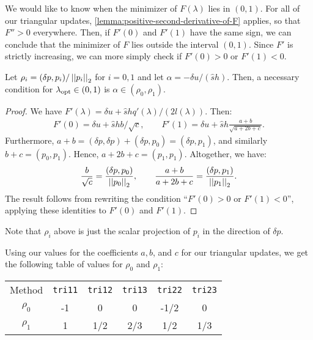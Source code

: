 \documentclass{article}
\begin{document}
We would like to know when the minimizer of $F(\lambda)$ lies in
$(0, 1)$. For all of our triangular updates,
\cref{lemma:positive-second-derivative-of-F} applies, so that
$F'' > 0$ everywhere. Then, if $F'(0)$ and $F'(1)$ have the same sign,
we can conclude that the minimizer of $F$ lies outside the interval
$(0, 1)$. Since $F'$ is strictly increasing, we can more simply check
if $F'(0) > 0$ or $F'(1) < 0$.

\begin{lemma}
  Let $\rho_i = (\delta p, p_i)/\left|\left|p_i\right|\right|_2$ for $i = 0, 1$ and let
  $\alpha = -\delta u/(\hat{s}h)$. Then, a necessary condition for
  $\lambda_{\operatorname{opt}} \in (0, 1)$ is $\alpha \in (\rho_0, \rho_1)$.
\end{lemma}

\begin{proof}
  We have
  $F'(\lambda) = \delta u + \hat{s} h q'(\lambda)/(2 l(\lambda))$. Then:
  \begin{align*}
    F'(0) = \delta u + \hat{s} h b / \sqrt{c}, \qquad F'(1) = \delta u + \hat{s} h \frac{a + b}{\sqrt{a + 2b + c}}.
  \end{align*}
  Furthermore,
  $a + b = (\delta p, \delta p) + (\delta p, p_0) = (\delta p, p_1)$,
  and similarly $b + c = (p_0, p_1)$. Hence,
  $a + 2b + c = (p_1, p_1)$. Altogether, we have:
  \begin{align*}
    \frac{b}{\sqrt{c}} = \frac{(\delta p, p_0)}{\left|\left|p_0\right|\right|_2}, \qquad \frac{a + b}{a + 2b + c} = \frac{(\delta p, p_1)}{\left|\left|p_1\right|\right|_2}.
  \end{align*}
  The result follows from rewriting the condition ``$F'(0) > 0$ or
  $F'(1) < 0$'', applying these identities to $F'(0)$ and $F'(1)$.
\end{proof}

Note that $\rho_i$ above is just the scalar projection of $p_i$ in the
direction of $\delta p$.

Using our values for the coefficients $a, b$, and $c$ for our
triangular updates, we get the following table of values for $\rho_0$
and $\rho_1$:
\begin{center}
  \begin{tabular}{c|ccccc}
    Method & \texttt{tri11} & \texttt{tri12} & \texttt{tri13} & \texttt{tri22} & \texttt{tri23} \\
    $\rho_0$ & -1 & 0 & 0 & -1/2 & 0 \\
    $\rho_1$ & 1 & 1/2 & 2/3 & 1/2 & 1/3
  \end{tabular}
\end{center}
\end{document}
